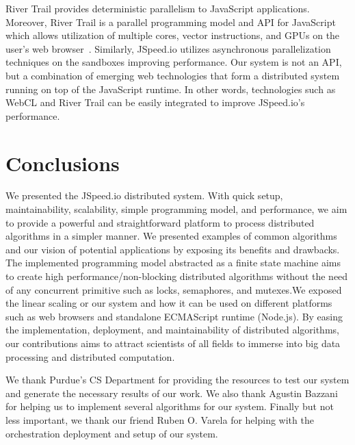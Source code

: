 \documentclass[10pt,reprint]{socc14}
\begin{document}
River Trail provides deterministic parallelism to JavaScript applications. Moreover, River Trail is a parallel programming model and API for JavaScript which allows utilization of multiple cores, vector instructions, and GPUs on the user's web browser~\cite{Herhut2013a}. Similarly, JSpeed.io utilizes asynchronous parallelization techniques on the sandboxes improving performance. Our system is not an API, but a combination of emerging web technologies that form a distributed system running on top of the JavaScript runtime. In other words, technologies such as WebCL and River Trail can be easily integrated to improve JSpeed.io’s performance. 


\section{Conclusions}

We presented the JSpeed.io distributed system. With quick setup, maintainability, scalability, simple programming model, and performance, we aim to provide a powerful and straightforward platform to process distributed algorithms in a simpler manner. We presented examples of common algorithms and our vision of potential applications by exposing its benefits and drawbacks. The implemented programming model abstracted as a finite state machine aims to create high performance/non-blocking distributed algorithms without the need of any concurrent primitive such as locks, semaphores, and mutexes.We exposed the linear scaling or our system and how it can be used on different platforms such as web browsers and standalone ECMAScript runtime (Node.js). By easing the implementation, deployment, and maintainability of distributed algorithms, our contributions aims to attract scientists of all fields to immerse into big data processing and distributed computation.


\acks

We thank Purdue’s CS Department for providing the resources to test our system and generate the necessary results of our work. We also thank Agustin Bazzani for helping us to implement several algorithms for our system. Finally but not less important, we thank our friend Ruben O. Varela for helping with the orchestration deployment and setup of our system.





{}



\end{document}

